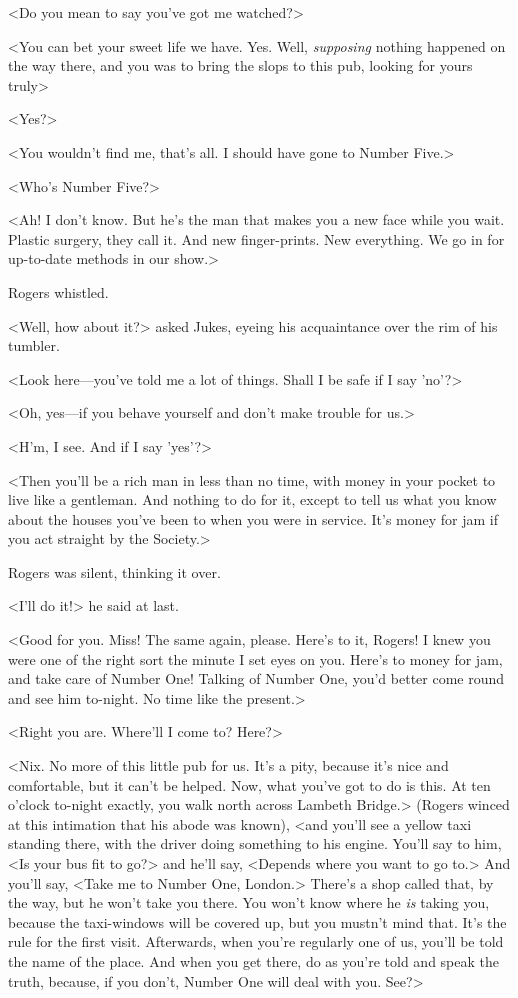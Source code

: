 <Do you mean to say you've got me watched?>

<You can bet your sweet life we have. Yes. Well, \textit{supposing} nothing happened on the way there, and you was to bring the slops to this pub, looking for yours truly\longdash>

<Yes?>

<You wouldn't find me, that's all. I should have gone to Number Five.>

<Who's Number Five?>

<Ah! I don't know. But he's the man that makes you a new face while you wait. Plastic surgery, they call it. And new finger-prints. New everything. We go in for up-to-date methods in our show.>

Rogers whistled.

<Well, how about it?> asked Jukes, eyeing his acquaintance over the rim of his tumbler.

<Look here—you've told me a lot of things. Shall I be safe if I say 'no'?>

<Oh, yes—if you behave yourself and don't make trouble for us.>

<H'm, I see. And if I say 'yes'?>

<Then you'll be a rich man in less than no time, with money in your pocket to live like a gentleman. And nothing to do for it, except to tell us what you know about the houses you've been to when you were in service. It's money for jam if you act straight by the Society.>

Rogers was silent, thinking it over.

<I'll do it!> he said at last.

<Good for you. Miss! The same again, please. Here's to it, Rogers! I knew you were one of the right sort the minute I set eyes on you. Here's to money for jam, and take care of Number One! Talking of Number One, you'd better come round and see him to-night. No time like the present.>

<Right you are. Where'll I come to? Here?>

<Nix. No more of this little pub for us. It's a pity, because it's nice and comfortable, but it can't be helped. Now, what you've got to do is this. At ten o'clock to-night exactly, you walk north across Lambeth Bridge.> (Rogers winced at this intimation that his abode was known), <and you'll see a yellow taxi standing there, with the driver doing something to his engine. You'll say to him, <Is your bus fit to go?> and he'll say, <Depends where you want to go to.> And you'll say, <Take me to Number One, London.> There's a shop called that, by the way, but he won't take you there. You won't know where he \textit{is} taking you, because the taxi-windows will be covered up, but you mustn't mind that. It's the rule for the first visit. Afterwards, when you're regularly one of us, you'll be told the name of the place. And when you get there, do as you're told and speak the truth, because, if you don't, Number One will deal with you. See?>

